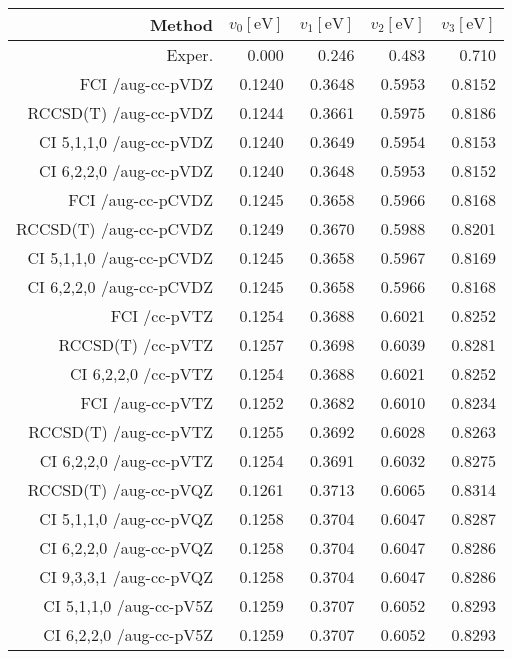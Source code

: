 \begin{tabular}{rrrrr}
\toprule
Method & $v_0 [\mathrm{eV}]$ & $v_1 [\mathrm{eV}]$ & $v_2 [\mathrm{eV}]$ & $v_3[\mathrm{eV}]$ \\ \midrule
 Exper. & 0.000 & 0.246 & 0.483 & 0.710 \\ \midrule
    FCI  /aug-cc-pVDZ & 0.1240 & 0.3648 & 0.5953 & 0.8152\\
RCCSD(T)  /aug-cc-pVDZ & 0.1244 & 0.3661 & 0.5975 & 0.8186\\
CI 5,1,1,0 /aug-cc-pVDZ & 0.1240 & 0.3649 & 0.5954 & 0.8153\\
CI 6,2,2,0 /aug-cc-pVDZ & 0.1240 & 0.3648 & 0.5953 & 0.8152\\
FCI  /aug-cc-pCVDZ & 0.1245 & 0.3658 & 0.5966 & 0.8168\\
RCCSD(T)  /aug-cc-pCVDZ & 0.1249 & 0.3670 & 0.5988 & 0.8201\\
CI 5,1,1,0 /aug-cc-pCVDZ & 0.1245 & 0.3658 & 0.5967 & 0.8169\\
CI 6,2,2,0 /aug-cc-pCVDZ & 0.1245 & 0.3658 & 0.5966 & 0.8168\\
FCI  /cc-pVTZ & 0.1254 & 0.3688 & 0.6021 & 0.8252\\
RCCSD(T)  /cc-pVTZ & 0.1257 & 0.3698 & 0.6039 & 0.8281\\
CI 6,2,2,0 /cc-pVTZ & 0.1254 & 0.3688 & 0.6021 & 0.8252\\
FCI  /aug-cc-pVTZ & 0.1252 & 0.3682 & 0.6010 & 0.8234\\
RCCSD(T)  /aug-cc-pVTZ & 0.1255 & 0.3692 & 0.6028 & 0.8263\\
CI 6,2,2,0 /aug-cc-pVTZ & 0.1254 & 0.3691 & 0.6032 & 0.8275\\
RCCSD(T)  /aug-cc-pVQZ & 0.1261 & 0.3713 & 0.6065 & 0.8314\\
CI 5,1,1,0 /aug-cc-pVQZ & 0.1258 & 0.3704 & 0.6047 & 0.8287\\
CI 6,2,2,0 /aug-cc-pVQZ & 0.1258 & 0.3704 & 0.6047 & 0.8286\\
CI 9,3,3,1 /aug-cc-pVQZ & 0.1258 & 0.3704 & 0.6047 & 0.8286\\
CI 5,1,1,0 /aug-cc-pV5Z & 0.1259 & 0.3707 & 0.6052 & 0.8293\\
CI 6,2,2,0 /aug-cc-pV5Z & 0.1259 & 0.3707 & 0.6052 & 0.8293\\
\bottomrule
\end{tabular}
    